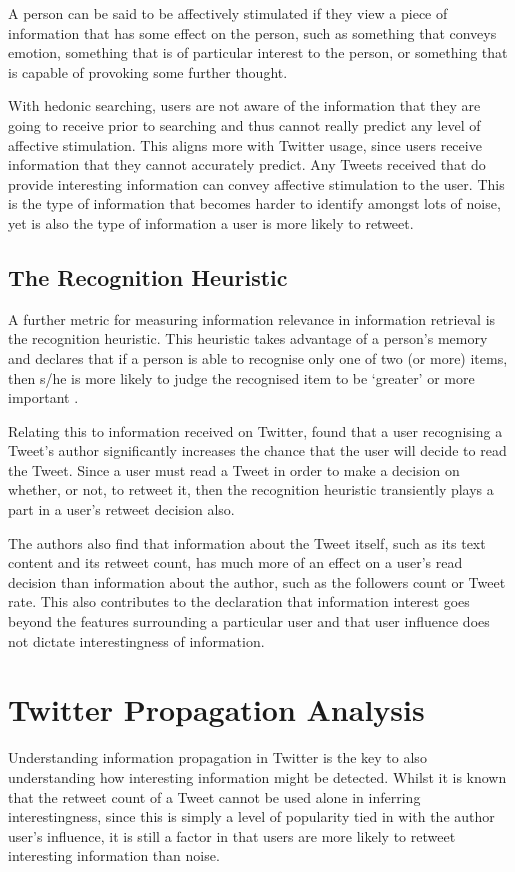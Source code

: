 A person can be said to be affectively stimulated if they view a piece of information that has some effect on the person, such as something that conveys emotion, something that is of particular interest to the person, or something that is capable of provoking some further thought.

With hedonic searching, users are not aware of the information that they are going to receive prior to searching and thus cannot really predict any level of affective stimulation. This aligns more with Twitter usage, since users receive information that they cannot accurately predict. Any Tweets received that do provide interesting information can convey affective stimulation to the user. This is the type of information that becomes harder to identify amongst lots of noise, yet is also the type of information a user is more likely to retweet.


\subsection{The Recognition Heuristic} 
A further metric for measuring information relevance in information retrieval is the recognition heuristic. This heuristic takes advantage of a person's memory and declares that if a person is able to recognise only one of two (or more) items, then s/he is more likely to judge the recognised item to be `greater' or more important \cite{oppenheimer03} \cite{goldstein99}.

Relating this to information received on Twitter, \cite{chorley12} found that a user recognising a Tweet's author significantly increases the chance that the user will decide to read the Tweet. Since a user must read a Tweet in order to make a decision on whether, or not, to retweet it, then the recognition heuristic transiently plays a part in a user's retweet decision also.

The authors also find that information about the Tweet itself, such as its text content and its retweet count, has much more of an effect on a user's read decision than information about the author, such as the followers count or Tweet rate. This also contributes to the declaration that information interest goes beyond the features surrounding a particular user and that user influence does not dictate interestingness of information.


\section{Twitter Propagation Analysis}
Understanding information propagation in Twitter is the key to also understanding how interesting information might be detected. Whilst it is known that the retweet count of a Tweet cannot be used alone in inferring interestingness, since this is simply a level of popularity tied in with the author user's influence, it is still a factor in that users are more likely to retweet interesting information than noise.


